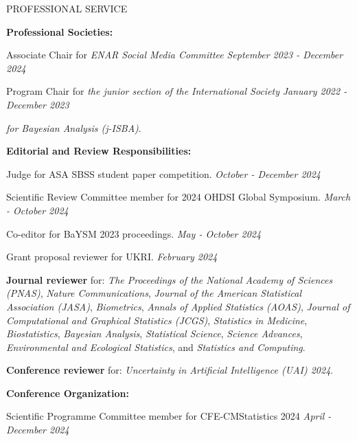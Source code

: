 \documentclass{resume} %
\newcommand{\thisYear}[1]{
	#1
}
\begin{document}
\begin{rSection}{PROFESSIONAL SERVICE}
	
	\hspace*{-0.2in}\textbf{Professional Societies:}
	
	Associate Chair for \emph{ENAR Social Media Committee}  \hfill {\em September 2023 - December 2024}

		\smallskip
	
	Program Chair for \emph{the junior section of the International Society} \hfill {\em January 2022 - December 2023}
	
	\vspace{-0.1in}
	\emph{for Bayesian Analysis (j-ISBA)}.
	
\medskip 

 \hspace*{-0.2in}\textbf{Editorial and Review Responsibilities:}
 
 	Judge for ASA SBSS student paper competition. 	 \hfill {\em October - December 2024}
 	
 	Scientific Review Committee member for 2024 OHDSI Global Symposium. 	\hfill {\em March - October 2024}
 	
 	\smallskip 
	
 Co-editor for BaYSM 2023 proceedings.	\hfill {\em May - October 2024}

    \smallskip 
    
 
    Grant proposal reviewer for UKRI.	\hfill {\em February 2024}

    
    \smallskip 
    
    \textbf{Journal reviewer} for: \emph{The Proceedings of the National Academy of Sciences (PNAS)}, \emph{Nature Communications}, \emph{Journal of the American Statistical Association (JASA)}, \emph{Biometrics}, \emph{Annals of Applied Statistics (AOAS)}, \emph{Journal of Computational and Graphical Statistics (JCGS)}, \emph{Statistics in Medicine}, \emph{Biostatistics}, \emph{Bayesian Analysis},  \emph{Statistical Science},  \emph{Science Advances}, \emph{Environmental and Ecological Statistics}, and \emph{Statistics and Computing}. 
    
 \smallskip 
%    
    \textbf{Conference reviewer} for: \emph{Uncertainty in Artificial Intelligence (UAI) 2024}. 
    
    \medskip 

 \hspace*{-0.2in}\textbf{Conference Organization:}
 
 Scientific Programme Committee member for CFE-CMStatistics 2024 \hfill {\em April - December 2024}
 

\end{rSection}
\end{document}

